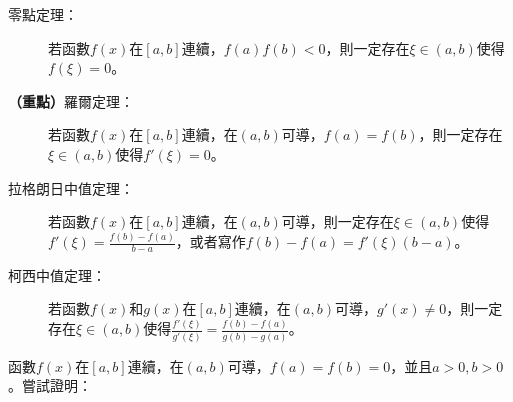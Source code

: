 \documentclass[12pt, addpoints]{exam}
\def \important{\textbf{（重點）}}
\def \hint#1{(\textit{#1})}
\begin{document}
\begin{questions}

\question
\begin{description}
    \item[零點定理：] 若函數$f(x)$在$[a,b]$連續，$f(a)f(b)<0$，則一定存在$\xi \in (a,b)$使得$f(\xi)=0$。
    \item[\important 羅爾定理：] 若函數$f(x)$在$[a,b]$連續，在$(a,b)$可導，$f(a)=f(b)$，則一定存在$\xi \in (a,b)$使得$f'(\xi)=0$。
    \item[拉格朗日中值定理：] 若函數$f(x)$在$[a,b]$連續，在$(a,b)$可導，則一定存在$\xi \in (a,b)$使得$\displaystyle f'(\xi)=\frac{f(b)-f(a)}{b-a}$，或者寫作$f(b)-f(a)=f'(\xi)(b-a)$。
    \item[柯西中值定理：] 若函數$f(x)$和$g(x)$在$[a,b]$連續，在$(a,b)$可導，$g'(x) \neq 0$，則一定存在$\xi \in (a,b)$使得$\displaystyle \frac{f'(\xi)}{g'(\xi)}=\frac{f(b)-f(a)}{g(b)-g(a)}$。
\end{description}

\question
函數$f(x)$在$[a,b]$連續，在$(a,b)$可導，$f(a)=f(b)=0$，並且$a>0, b>0$。嘗試證明：

\end{questions}
\end{document}

